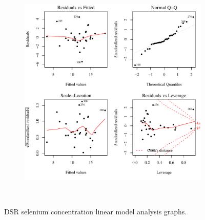 \begin{linenumbers}
\begin{landscape}
\begin{figure}
\begin{subfigure}{0.7\textwidth}
			\includegraphics[width=\tableCustomSize]{"Figures/Results_DSR/Stochastic/Conc Model lm-fit WIL"}
		\end{subfigure}\\
		\caption{DSR selenium concentration linear model analysis graphs.}
	\end{figure}
\end{landscape}


\end{linenumbers}
